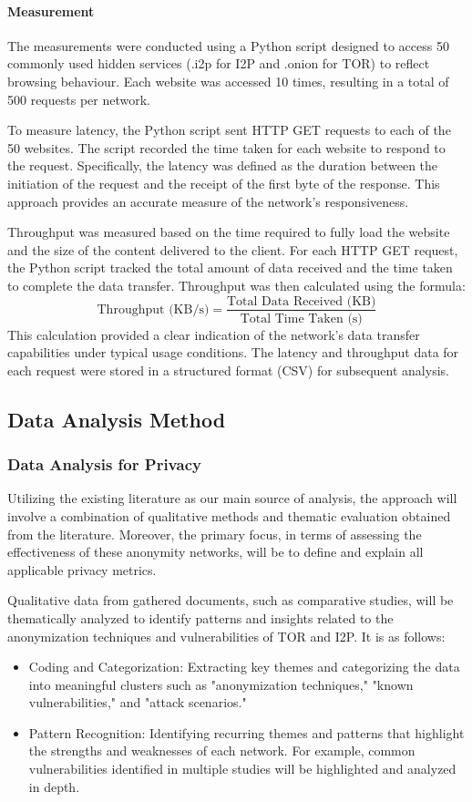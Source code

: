 \documentclass[12pt,conference]{IEEEtran}
\begin{document}
\paragraph{Measurement} The measurements were conducted using a Python script designed to access 50 commonly used hidden services (.i2p for I2P and .onion for TOR) to reflect browsing behaviour. Each website was accessed 10 times, resulting in a total of 500 requests per network.

To measure latency, the Python script sent HTTP GET requests to each of the 50 websites. The script recorded the time taken for each website to respond to the request. Specifically, the latency was defined as the duration between the initiation of the request and the receipt of the first byte of the response. This approach provides an accurate measure of the network's responsiveness.

Throughput was measured based on the time required to fully load the website and the size of the content delivered to the client. For each HTTP GET request, the Python script tracked the total amount of data received and the time taken to complete the data transfer. Throughput was then calculated using the formula:
\[
\text{Throughput (KB/s)} = \frac{\text{Total Data Received (KB)}}{\text{Total Time Taken (s)}}
\]
This calculation provided a clear indication of the network's data transfer capabilities under typical usage conditions. The latency and throughput data for each request were stored in a structured format (CSV) for subsequent analysis.

\subsection{Data Analysis Method}
\subsubsection{Data Analysis for Privacy}
Utilizing the existing literature as our main source of analysis, the approach will involve a combination of qualitative methods and thematic evaluation obtained from the literature. Moreover, the primary focus, in terms of assessing the effectiveness of these anonymity networks, will be to define and explain all applicable privacy metrics.

Qualitative data from gathered documents, such as comparative studies, will be thematically analyzed to identify patterns and insights related to the anonymization techniques and vulnerabilities of TOR and I2P. It is as follows:
\begin{itemize}
	\item Coding and Categorization: Extracting key themes and categorizing the data into meaningful clusters such as "anonymization techniques," "known vulnerabilities," and "attack scenarios."
	\item Pattern Recognition: Identifying recurring themes and patterns that highlight the strengths and weaknesses of each network. For example, common vulnerabilities identified in multiple studies will be highlighted and analyzed in depth.
\end{itemize}
\end{document}
